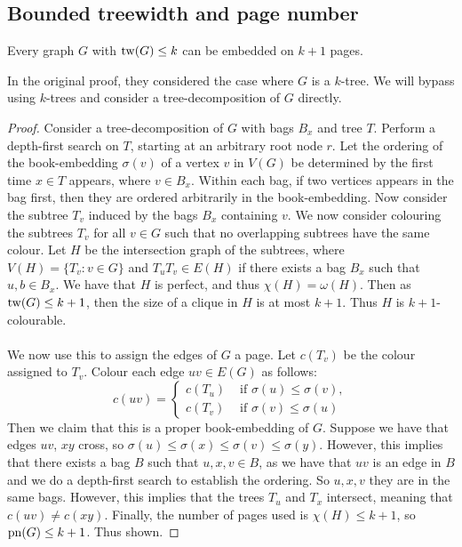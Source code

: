 \subsection{Bounded treewidth and page number}\label{ssec:Bounded_Treewidth}
\begin{theorem}\label{thm:bded_treewidth_bded_pagenumber}
	Every graph \(G\) with \(\operatorname{tw}(G) \leq k\) can be embedded on $k + 1$ pages.
\end{theorem}
In the original proof, they considered the case where \(G\) is a \(k\)-tree. We will bypass using \(k\)-trees and consider a tree-decomposition of \(G\) directly.

\begin{proof}
	Consider a tree-decomposition of \(G\) with bags $B_x$ and tree $T$. Perform a depth-first search on \(T\), starting at an arbitrary root node \(r\). Let the ordering of the book-embedding \(\sigma(v)\) of a vertex \(v\) in \(V(G)\) be determined by the first time \(x \in T\) appears, where \(v \in B_x\). Within each bag, if two vertices appears in the bag first, then they are ordered arbitrarily in the book-embedding. Now consider the subtree \(T_v\) induced by the bags \(B_x\) containing \(v\). We now consider colouring the subtrees \(T_v\) for all \(v \in G\) such that no overlapping subtrees have the same colour. Let \(H\) be the intersection graph of the subtrees, where \(V(H) = \lbrace T_v : v \in G \rbrace\) and \(T_u T_v \in E(H)\) if there exists a bag \(B_x\) such that \(u, b \in B_x\). We have that \(H\) is perfect, and thus \(\chi(H) = \omega(H)\). Then as \(\operatorname{tw}(G) \leq k + 1\), then the size of a clique in \(H\) is at most \(k + 1\). Thus \(H\) is \(k + 1\)-colourable.
	\paragraph{}
	We now use this to assign the edges of \(G\) a page. Let \(c(T_v)\) be the colour assigned to \(T_v\). Colour each edge \(uv \in E(G)\) as follows:
	\begin{equation}
		c(uv) =
		\begin{cases}
			c(T_u) & \text{ if } \sigma(u) \leq \sigma(v), \\
			c(T_v) & \text{ if } \sigma(v) \leq \sigma(u)
		\end{cases}
	\end{equation}
	Then we claim that this is a proper book-embedding of \(G\). Suppose we have that edges \(uv\), \(xy\) cross, so \(\sigma(u) \leq \sigma(x) \leq \sigma(v) \leq \sigma(y)\). However, this implies that there exists a bag \(B\) such that \(u, x, v \in B\), as we have that \(uv\) is an edge in \(B\) and we do a depth-first search to establish the ordering. So \(u, x, v\) they are in the same bags. However, this implies that the trees \(T_u\) and \(T_x\) intersect, meaning that \(c(uv) \neq c(xy)\). Finally, the number of pages used is \(\chi(H) \leq k + 1\), so \(\operatorname{pn}(G) \leq k + 1\). Thus shown.
\end{proof}

